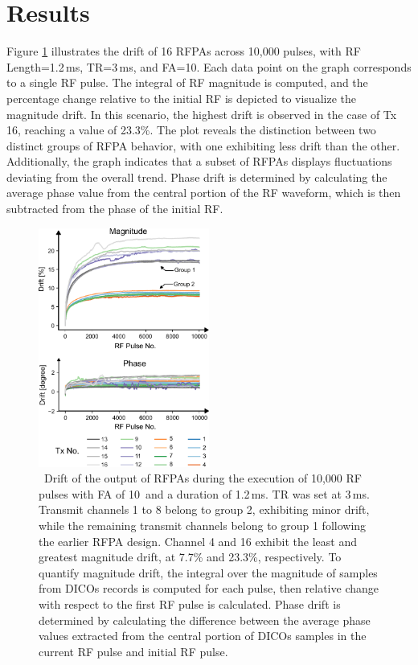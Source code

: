\section{Results}\label{sec3}

Figure \ref{fig:drift_assessment1} illustrates the drift of 16 RFPAs across 10,000 pulses, with RF Length=1.2\,ms, TR=3\,ms, and FA=10\textdegree. Each data point on the graph corresponds to a single RF pulse. The integral of RF magnitude is computed, and the percentage change relative to the initial RF is depicted to visualize the magnitude drift. In this scenario, the highest drift is observed in the case of Tx 16, reaching a value of 23.3\%. The plot reveals the distinction between two distinct groups of RFPA behavior, with one exhibiting less drift than the other. Additionally, the graph indicates that a subset of RFPAs displays fluctuations deviating from the overall trend. Phase drift is determined by calculating the average phase value from the central portion of the RF waveform, which is then subtracted from the phase of the initial RF.

\begin{figure}[h]
    \centering
    \includegraphics[width=0.5\textwidth]{figures/drift_assesment_plot.pdf}
    \caption{\ Drift of the output of RFPAs during the execution of 10,000 RF pulses with FA of 10\textdegree\, and a duration of 1.2\,ms. TR was set at 3\,ms. Transmit channels 1 to 8 belong to group 2, exhibiting minor drift, while the remaining transmit channels belong to group 1 following the earlier RFPA design. Channel 4 and 16 exhibit the least and greatest magnitude drift, at 7.7\% and 23.3\%, respectively. To quantify magnitude drift, the integral over the magnitude of samples from DICOs records is computed for each pulse, then relative change with respect to the first RF pulse is calculated. Phase drift is determined by calculating the difference between the average phase values extracted from the central portion of DICOs samples in the current RF pulse and initial RF pulse.}
    \label{fig:drift_assessment1}
\end{figure}

